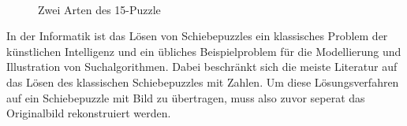 \documentclass{whswinvcbook}
\begin{document}
\begin{figure}[H]
    \centering
    \quad\quad\quad\quad
    \\
    \quad\quad\quad\quad
    \caption{Zwei Arten des 15-Puzzle}
    \label{fig-15-puzzle}
\end{figure}
In der Informatik ist das Lösen von Schiebepuzzles ein klassisches Problem der künstlichen Intelligenz und ein übliches Beispielproblem für die Modellierung und Illustration von Suchalgorithmen. Dabei beschränkt sich die meiste Literatur auf das Lösen des klassischen Schiebepuzzles mit Zahlen. Um diese Lösungsverfahren auf ein Schiebepuzzle mit Bild zu übertragen, muss also zuvor seperat das Originalbild rekonstruiert werden.
\end{document}
